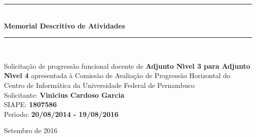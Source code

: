 \documentclass[a4paper,oneside,10pt]{article}
\begin{document}
\begin{titlepage}

\vspace{-5.0cm}

\begin{figure}[!htb]
 \label{fig:UFPE_logo}
\end{figure}

\begin{center}
\vspace{1cm}
\rule{1.0\textwidth}{1pt} \\ [0.5cm]
{\Huge \textbf{\textsf{Memorial Descritivo de Atividades}}} \\
\rule{1.0\textwidth}{1pt} \\
\vspace{2cm}

\doublespacing
{\Large \textsf{Solicita\c{c}\~{a}o de progress\~{a}o funcional docente de \textbf{Adjunto N\'{\i}vel 3 para Adjunto N\'{\i}vel 4} apresentada \`{a} Comiss\~{a}o de Avalia\c{c}\~{a}o de Progress\~{a}o Horizontal do Centro de Inform\'{a}tica da Universidade Federal de Pernambuco}}\\
\vspace{1.5cm}
{\LARGE \textsf{Solicitante: \textbf{Vinicius Cardoso Garcia}}}\\
\vspace{0.5cm}
{\Large \textsf{SIAPE: \textbf{1807586}}} \\
\vspace{0.5cm}
{\Large \textsf{Per\'{\i}odo: \textbf{20/08/2014 - 19/08/2016}}} \\

\vspace{2.0cm}

\normalsize \textsf{Setembro de 2016}

\end{center}
\thispagestyle{empty}
\end{titlepage}

\tableofcontents


\newpage
\end{document}

